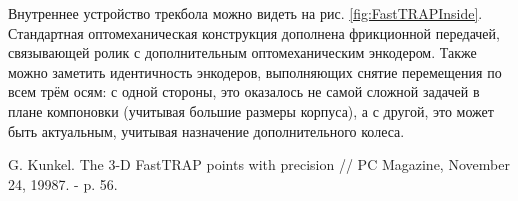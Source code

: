 \documentclass[11pt, a4paper]{article}
\begin{document}
Внутреннее устройство трекбола можно видеть на рис. \ref{fig:FastTRAPInside}.
Стандартная оптомеханическая конструкция дополнена фрикционной передачей, связывающей ролик с дополнительным оптомеханическим энкодером. Также можно заметить идентичность энкодеров, выполняющих снятие перемещения по всем трём осям: с одной стороны, это оказалось не самой сложной задачей в плане компоновки (учитывая большие размеры корпуса), а с другой, это может быть актуальным, учитывая назначение дополнительного колеса.

\begin{thebibliography}{9}
 G. Kunkel. The 3-D FastTRAP points with precision // PC Magazine, November 24, 19987. - p. 56.
\end{thebibliography}
\end{document}

